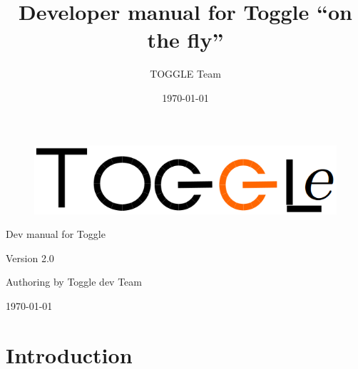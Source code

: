 \documentclass[a4paper,10pt]{report}
\title{Developer manual for Toggle ``on the fly''}
\author{TOGGLE Team}
\date{\today}
\begin{document}
\begin{titlepage}



  \begin{figure}
    \begin{center}
      \includegraphics[width=1\linewidth]{images/toggleLogo.png}
    \end{center}
  \end{figure}


  \begin{center}

     \Huge{Dev manual for Toggle}
     \newline
     \newline
     \newline
  \end{center}
  
  \begin{center}
    \huge{Version 2.0}
    \newline
    \newline
    \newline
  \end{center}
  
  \begin{center}
    \huge{Authoring by Toggle dev Team}
    \newline
    \newline
    \newline
  \end{center}
  
  \begin{center}
    \large{\today}
  \end{center}

\end{titlepage}

\newpage

\tableofcontents

\chapter{Introduction}
\end{document}
